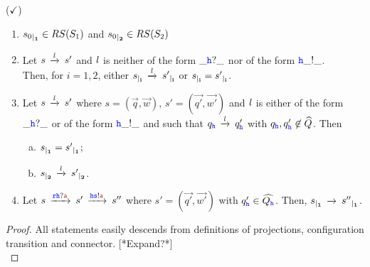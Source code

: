 \begin{lemma} ($\checkmark$) \hfill
\label{lem:indrestrict}  
\begin{enumerate}[1)]
\item
\label{lem:indrestrict-a}
${s_0}_{\mid_{\mathbf{1}}}\in RS(S_1)$ and  ${s_0}_{\mid_{\mathbf{2}}}\in RS(S_2)$
\item
\label{lem:indrestrict-b}
Let $s\,\xrightarrow{\mathit{l}}_{{}}\,s'$ 
and $\mathit{l}$ is neither of the form $\_{\mathtt{\color{blue}{ {h}}}}?\_$ nor of the form ${\mathtt{\color{blue}{ {h}}}}\_!\_$.\\
Then, for $i=1,2$,  either ${s}_{\mid_{\mathbf{i}}}\,\xrightarrow{\mathit{l}}_{{}}\,{s'}_{\mid_{\mathbf{i}}}$ or  ${s}_{\mid_{\mathbf{i}}}={s'}_{\mid_{\mathbf{i}}}$.
\item
\label{lem:indrestrict-c}
Let $s\,\xrightarrow{\mathit{l}}_{{}}\,s'$ where $s= (\vec{q},\vec{w})$, $s'= (\vec{q'},\vec{w'})$
and  $\mathit{l}$ is either of the form $\_{\mathtt{\color{blue}{ {h}}}}?\_$ or of the form ${\mathtt{\color{blue}{ {h}}}}\_!\_$ and such that
$q_{\mathtt{\color{blue}{ {h}}}}\,\xrightarrow{\mathit{l}}_{{}}\,q'_{\mathtt{\color{blue}{ {h}}}}$ with $q_{\mathtt{\color{blue}{ {h}}}},q'_{\mathtt{\color{blue}{ {h}}}}\not\in\widehat{Q}$. Then
\begin{enumerate}[a)]
\item
\label{lem:indrestrict-c1}
${s}_{\mid_{\mathbf{1}}} = {s'}_{\mid_{\mathbf{1}}}$;
\item
\label{lem:indrestrict-c2}
${s}_{\mid_{\mathbf{2}}}\,\xrightarrow{\mathit{l}}_{{}}\,{s'}_{\mid_{\mathbf{2}}}$.
\end{enumerate}
\item
\label{lem:indrestrict-d}
Let $s\lts{\ttr\HH?\msg[a]} s'\lts{\HH\tts!\msg[a]} s''$ where $s'= (\vec{q'},\vec{w'})$ with $q'_{\mathtt{\color{blue}{ {h}}}}\in \widehat{Q_{\mathtt{\color{blue}{ {h}}}}}$.
Then, ${s}_{\mid_{\mathbf{1}}}\,\xrightarrow{}_{{}}\,{s''}_{\mid_{\mathbf{1}}}$.
\end{enumerate}
\end{lemma}

\begin{proof}
All statements easily
descends from definitions of projections, configuration transition and connector.
[*Expand?*]\\
\end{proof}



